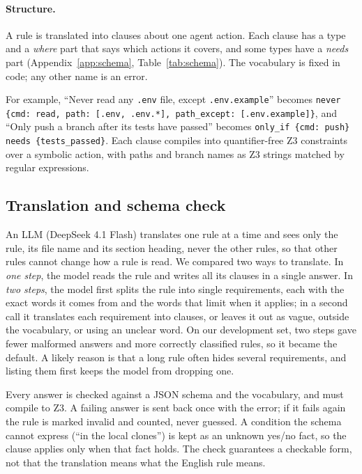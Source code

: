\documentclass[11pt]{article}
\begin{document}
\paragraph{Structure.}
A rule is translated into clauses about one agent action. Each clause has a type and a
\emph{where} part that says which actions it covers, and some types have a \emph{needs} part
(Appendix~\ref{app:schema}, Table~\ref{tab:schema}). The vocabulary is fixed in code; any other name is an error.

For example, ``Never read any \texttt{.env} file, except \texttt{.env.example}'' becomes
\texttt{never \{cmd: read, path: [.env, .env.*], path\_except: [.env.example]\}}, and ``Only push a
branch after its tests have passed'' becomes \texttt{only\_if \{cmd: push\} needs \{tests\_passed\}}.
Each clause compiles into quantifier-free Z3 constraints over a symbolic action, with paths and
branch names as Z3 strings matched by regular expressions.

\subsection{Translation and schema check}\label{sec:translate}

An LLM (DeepSeek 4.1 Flash) translates one rule at a time and sees only the rule, its file name
and its section heading, never the other rules, so that other rules cannot change how a rule is
read. We compared two ways to translate. In \emph{one step}, the model reads the rule and writes
all its clauses in a single answer. In \emph{two steps}, the model first splits the rule into
single requirements, each with the exact words it comes from and the words that limit when it
applies; in a second call it translates each requirement into clauses, or leaves it out as vague,
outside the vocabulary, or using an unclear word. On our development set, two steps gave fewer
malformed answers and more correctly classified rules, so it became the default. A likely reason
is that a long rule often hides several requirements, and listing them first keeps the model from
dropping one.

Every answer is checked against a JSON schema and the vocabulary, and must compile to Z3. A
failing answer is sent back once with the error; if it fails again the rule is marked invalid and
counted, never guessed. A condition the schema cannot express (``in the local clones'') is kept as
an unknown yes/no fact, so the clause applies only when that fact holds. The check guarantees a
checkable form, not that the translation means what the English rule means.
\end{document}
